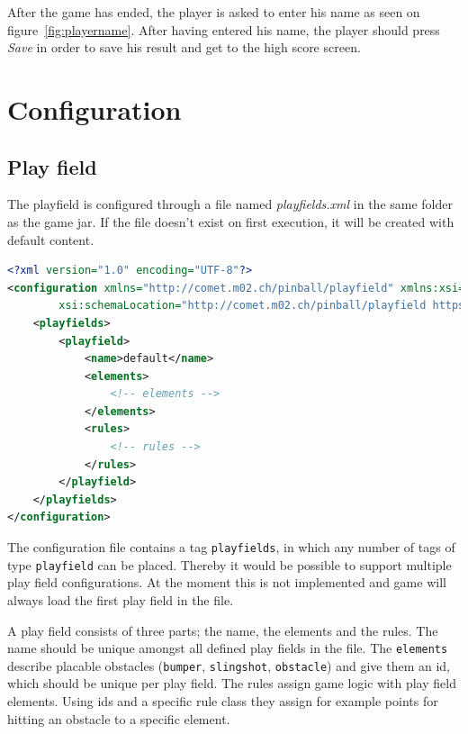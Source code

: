 \documentclass[fontsize=12pt,
               paper=a4,
               twoside=false,
               parskip=half,
               ]{scrartcl}
\begin{document}
After the game has ended, the player is asked to enter his name as seen on figure~\ref{fig:playername}. After having entered his name, the player should press \emph{Save} in order to save his result and get to the high score screen.

\section{Configuration}
\label{sec:configuration}

\subsection{Play field}

The playfield is configured through a file named \emph{playfields.xml} in the same folder as the game jar. If the file doesn't exist on first execution, it will be created with default content.

\begin{minipage}[]{\linewidth}
\begin{lstlisting}[language=xml,label=lst:default_playfield,caption={playfields.xml}]
<?xml version="1.0" encoding="UTF-8"?>
<configuration xmlns="http://comet.m02.ch/pinball/playfield" xmlns:xsi="http://www.w3.org/2001/XMLSchema-instance"
		xsi:schemaLocation="http://comet.m02.ch/pinball/playfield https://raw.github.com/boskoop/comet-pinball/master/schema/playfield.xsd">
	<playfields>
		<playfield>
			<name>default</name>
			<elements>
				<!-- elements -->
			</elements>
			<rules>
				<!-- rules -->
			</rules>
		</playfield>
	</playfields>
</configuration>
\end{lstlisting}
\end{minipage}

The configuration file contains a tag \texttt{playfields}, in which any number of tags of type \texttt{playfield} can be placed. Thereby it would be possible to support multiple play field configurations. At the moment this is not implemented and game will always load the first play field in the file.

A play field consists of three parts; the name, the elements and the rules. The name should be unique amongst all defined play fields in the file. The \texttt{elements} describe placable obstacles (\texttt{bumper}, \texttt{slingshot}, \texttt{obstacle}) and give them an id, which should be unique per play field. The rules assign game logic with play field elements. Using ids and a specific rule class they assign for example points for hitting an obstacle to a specific element.
\end{document}
